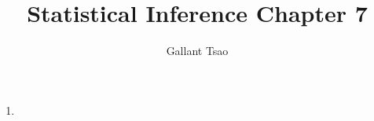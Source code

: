 \documentclass{article}
\title{Statistical Inference Chapter 7}
\author{Gallant Tsao}
\begin{document}
\maketitle

\begin{enumerate}
    \item 
\end{enumerate}
\end{document}
